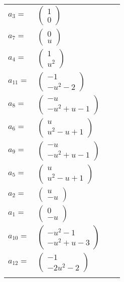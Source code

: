 \documentclass[1p]{elsarticle_modified}
\theoremstyle{definition}
\begin{document}
\begin{tabular}{m{7pt} m{180pt} m{7pt} m{180pt} }
\flushright $a_{3}=$&$\begin{pmatrix}1\\0\end{pmatrix}$ \\
\flushright $a_{7}=$&$\begin{pmatrix}0\\u\end{pmatrix}$ \\
\flushright $a_{4}=$&$\begin{pmatrix}1\\u^2\end{pmatrix}$ \\
\flushright $a_{11}=$&$\begin{pmatrix}-1\\- u^2-2\end{pmatrix}$ \\
\flushright $a_{8}=$&$\begin{pmatrix}- u\\- u^2+u-1\end{pmatrix}$ \\
\flushright $a_{6}=$&$\begin{pmatrix}u\\u^2- u+1\end{pmatrix}$ \\
\flushright $a_{9}=$&$\begin{pmatrix}- u\\- u^2+u-1\end{pmatrix}$ \\
\flushright $a_{5}=$&$\begin{pmatrix}u\\u^2- u+1\end{pmatrix}$ \\
\flushright $a_{2}=$&$\begin{pmatrix}u\\- u\end{pmatrix}$ \\
\flushright $a_{1}=$&$\begin{pmatrix}0\\- u\end{pmatrix}$ \\
\flushright $a_{10}=$&$\begin{pmatrix}- u^2-1\\- u^2+u-3\end{pmatrix}$ \\
\flushright $a_{12}=$&$\begin{pmatrix}-1\\-2 u^2-2\end{pmatrix}$\\&\end{tabular}
\end{document}
